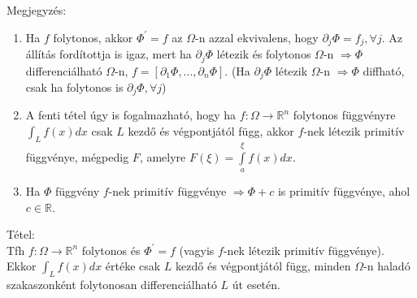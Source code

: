 \documentclass[12pt,a4paper]{scrartcl}
\providecommand{\tightlist}{%
  \setlength{\itemsep}{0pt}\setlength{\parskip}{0pt}}
\newenvironment{tetel}{}{}
\newenvironment{megjegyzes}{}{}
\begin{document}
\begin{megjegyzes}

Megjegyzés:

\begin{enumerate}
\def\labelenumi{\arabic{enumi}.}
\tightlist
\item
  Ha \(f\) folytonos, akkor \(\Phi^{\prime} = f\) az \(\Omega\)-n azzal
  ekvivalens, hogy \(\partial_{j}\Phi = f_{j},\forall j\). Az állítás
  fordítottja is igaz, mert ha \(\partial_{j}\Phi\) létezik és folytonos
  \(\Omega\)-n \(\left. \Rightarrow\Phi \right.\) differenciálható
  \(\Omega\)-n,
  \(f = \left\lbrack {\partial_{1}\Phi,...,\partial_{n}\Phi} \right\rbrack\).
  (Ha \(\partial_{j}\Phi\) létezik \(\Omega\)-n \(\Rightarrow\Phi\)
  diffható, csak ha folytonos is \(\partial_{j}\Phi,\forall j\))
\item
  A fenti tétel úgy is fogalmazható, hogy ha
  \(\left. f:\Omega\rightarrow{\mathbb{R}}^{n} \right.\) folytonos
  függvényre \(\int_{L}{f\left( x \right)dx}\) csak \(L\) kezdő és
  végpontjától függ, akkor \(f\)-nek létezik primitív függvénye,
  mégpedig \(F\), amelyre
  \(F\left( \xi \right) = {\int\limits_{a}^{\xi}{f\left( x \right)dx}}\).
\item
  Ha \(\Phi\) függvény \(f\)-nek primitív függvénye
  \(\left. \Rightarrow\Phi + c \right.\) is primitív függvénye, ahol
  \(c \in {\mathbb{R}}\).
\end{enumerate}

\end{megjegyzes}

\begin{tetel}

Tétel:\\
Tfh \(\left. f:\Omega\rightarrow{\mathbb{R}}^{n} \right.\) folytonos és
\(\Phi^{\prime} = f\) (vagyis \(f\)-nek létezik primitív függvénye).
Ekkor \(\int_{L}{f\left( x \right)dx}\) értéke csak \(L\) kezdő és
végpontjától függ, minden \(\Omega\)-n haladó szakaszonként folytonosan
differenciálható \(L\) út esetén.

\end{tetel}
\end{document}
